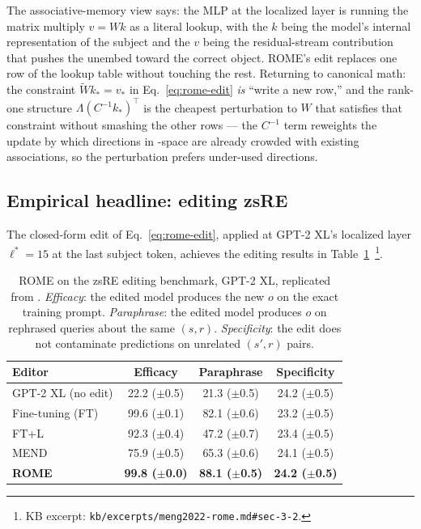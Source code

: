 \begin{intuition}
The associative-memory view says: the MLP at the localized layer is
running the matrix multiply $v = W k$ as a literal lookup, with the
 $k$ being the model's internal representation of the subject and
the  $v$ being the residual-stream contribution that pushes the
unembed toward the correct object. ROME's edit replaces one row of the
lookup table without touching the rest. Returning to canonical math:
the constraint $\tilde{W} k_* = v_*$ in Eq.~\eqref{eq:rome-edit}
\emph{is} ``write a new row,'' and the rank-one structure
$\Lambda (C^{-1} k_*)^{\top}$ is the cheapest perturbation to $W$ that
satisfies that constraint without smashing the other rows --- the
$C^{-1}$ term reweights the update by which directions in -space
are already crowded with existing associations, so the perturbation
prefers under-used directions.
\end{intuition}

\subsection{Empirical headline: editing zsRE}
\label{sec:rome-zsre}

The closed-form edit
of Eq.~\eqref{eq:rome-edit}, applied at GPT-2 XL's localized layer
$\ell^* = 15$ at the last subject token, achieves the editing
results in
Table~\ref{tab:rome-zsre}~\citep[\S 3.2]{meng2022-rome}\footnote{KB
excerpt: \nolinkurl{kb/excerpts/meng2022-rome.md#sec-3-2}.}.

\begin{table}[h]
\centering
\small
\begin{tabular}{@{}lccc@{}}
\toprule
Editor & Efficacy & Paraphrase & Specificity \\
\midrule
GPT-2 XL (no edit)  & 22.2 (\(\pm\)0.5) & 21.3 (\(\pm\)0.5) & 24.2 (\(\pm\)0.5) \\
Fine-tuning (FT)    & 99.6 (\(\pm\)0.1) & 82.1 (\(\pm\)0.6) & 23.2 (\(\pm\)0.5) \\
FT+L                & 92.3 (\(\pm\)0.4) & 47.2 (\(\pm\)0.7) & 23.4 (\(\pm\)0.5) \\
MEND                & 75.9 (\(\pm\)0.5) & 65.3 (\(\pm\)0.6) & 24.1 (\(\pm\)0.5) \\
\textbf{ROME}       & \textbf{99.8 (\(\pm\)0.0)} & \textbf{88.1 (\(\pm\)0.5)} & \textbf{24.2 (\(\pm\)0.5)} \\
\bottomrule
\end{tabular}
\caption{ROME on the zsRE editing benchmark, GPT-2 XL, replicated from
\citet[\S 3.2]{meng2022-rome}. \emph{Efficacy}: the edited model
produces the new $o$ on the exact training prompt. \emph{Paraphrase}:
the edited model produces $o$ on rephrased queries about the same
$(s, r)$. \emph{Specificity}: the edit does not contaminate predictions
on unrelated $(s', r)$ pairs.}
\label{tab:rome-zsre}
\end{table}

